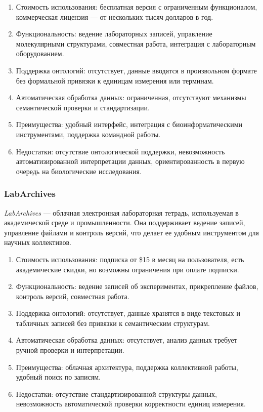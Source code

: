 \begin{enumerate}
    \item Стоимость использования: бесплатная версия с ограниченным функционалом, коммерческая лицензия — от нескольких тысяч долларов в год.
    \item Функциональность: ведение лабораторных записей, управление молекулярными структурами, совместная работа, интеграция с лабораторным оборудованием.
    \item Поддержка онтологий: отсутствует, данные вводятся в произвольном формате без формальной привязки к единицам измерения или терминам.
    \item Автоматическая обработка данных: ограниченная, отсутствуют механизмы семантической проверки и стандартизации.
    \item Преимущества: удобный интерфейс, интеграция с биоинформатическими инструментами, поддержка командной работы.
    \item Недостатки: отсутствие онтологической поддержки, невозможность автоматизированной интерпретации данных, ориентированность в первую очередь на биологические исследования.
\end{enumerate}

\subsubsection{LabArchives}

\textit{LabArchives}\cite{ELN:LabArchives} — облачная электронная лабораторная тетрадь, используемая в академической среде и промышленности. Она поддерживает ведение записей, управление файлами и контроль версий, что делает ее удобным инструментом для научных коллективов.

\begin{enumerate}
    \item Стоимость использования: подписка от \$15 в месяц на пользователя, есть академические скидки, но возможны ограничения при оплате подписки.
    \item Функциональность: ведение записей об экспериментах, прикрепление файлов, контроль версий, совместная работа.
    \item Поддержка онтологий: отсутствует, данные хранятся в виде текстовых и табличных записей без привязки к семантическим структурам.
    \item Автоматическая обработка данных: отсутствует, анализ данных требует ручной проверки и интерпретации.
    \item Преимущества: облачная архитектура, поддержка коллективной работы, удобный поиск по записям.
    \item Недостатки: отсутствие стандартизированной структуры данных, невозможность автоматической проверки корректности единиц измерения.
\end{enumerate}

